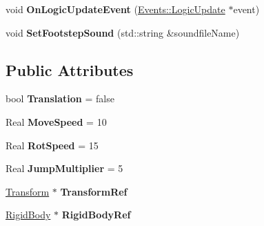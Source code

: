 \begin{DoxyCompactItemize}
\item 
\hypertarget{classDCEngine_1_1Components_1_1DebugMoveController_a27928e27655218bff759d9957e4c5957}{void {\bfseries On\-Logic\-Update\-Event} (\hyperlink{classDCEngine_1_1Events_1_1LogicUpdate}{Events\-::\-Logic\-Update} $\ast$event)}\label{classDCEngine_1_1Components_1_1DebugMoveController_a27928e27655218bff759d9957e4c5957}

\item 
\hypertarget{classDCEngine_1_1Components_1_1DebugMoveController_a7e9d52bec89aaf3bfbfa488410bc342f}{void {\bfseries Set\-Footstep\-Sound} (std\-::string \&soundfile\-Name)}\label{classDCEngine_1_1Components_1_1DebugMoveController_a7e9d52bec89aaf3bfbfa488410bc342f}

\end{DoxyCompactItemize}
\subsection*{Public Attributes}
\begin{DoxyCompactItemize}
\item 
\hypertarget{classDCEngine_1_1Components_1_1DebugMoveController_a88988103f12f82e91aa791f608b91a00}{bool {\bfseries Translation} = false}\label{classDCEngine_1_1Components_1_1DebugMoveController_a88988103f12f82e91aa791f608b91a00}

\item 
\hypertarget{classDCEngine_1_1Components_1_1DebugMoveController_a2864d2a5f695154f534477a14b555071}{Real {\bfseries Move\-Speed} = 10}\label{classDCEngine_1_1Components_1_1DebugMoveController_a2864d2a5f695154f534477a14b555071}

\item 
\hypertarget{classDCEngine_1_1Components_1_1DebugMoveController_a2a95e0c57a4fd8a2b44297ef01244fe7}{Real {\bfseries Rot\-Speed} = 15}\label{classDCEngine_1_1Components_1_1DebugMoveController_a2a95e0c57a4fd8a2b44297ef01244fe7}

\item 
\hypertarget{classDCEngine_1_1Components_1_1DebugMoveController_a018c3509fca8f6c545976e6c354086bb}{Real {\bfseries Jump\-Multiplier} = 5}\label{classDCEngine_1_1Components_1_1DebugMoveController_a018c3509fca8f6c545976e6c354086bb}

\item 
\hypertarget{classDCEngine_1_1Components_1_1DebugMoveController_a893c0ee9fc1fff7c68e61521516e4240}{\hyperlink{classDCEngine_1_1Components_1_1Transform}{Transform} $\ast$ {\bfseries Transform\-Ref}}\label{classDCEngine_1_1Components_1_1DebugMoveController_a893c0ee9fc1fff7c68e61521516e4240}

\item 
\hypertarget{classDCEngine_1_1Components_1_1DebugMoveController_a4b8a59951be8e7e3778d835949c9c1da}{\hyperlink{classDCEngine_1_1Components_1_1RigidBody}{Rigid\-Body} $\ast$ {\bfseries Rigid\-Body\-Ref}}\label{classDCEngine_1_1Components_1_1DebugMoveController_a4b8a59951be8e7e3778d835949c9c1da}

\end{DoxyCompactItemize}

